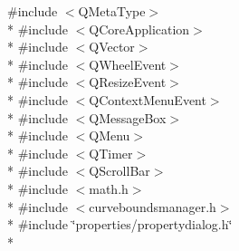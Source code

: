 {\ttfamily \#include $<$Q\+Meta\+Type$>$}\\*
{\ttfamily \#include $<$Q\+Core\+Application$>$}\\*
{\ttfamily \#include $<$Q\+Vector$>$}\\*
{\ttfamily \#include $<$Q\+Wheel\+Event$>$}\\*
{\ttfamily \#include $<$Q\+Resize\+Event$>$}\\*
{\ttfamily \#include $<$Q\+Context\+Menu\+Event$>$}\\*
{\ttfamily \#include $<$Q\+Message\+Box$>$}\\*
{\ttfamily \#include $<$Q\+Menu$>$}\\*
{\ttfamily \#include $<$Q\+Timer$>$}\\*
{\ttfamily \#include $<$Q\+Scroll\+Bar$>$}\\*
{\ttfamily \#include $<$math.\+h$>$}\\*
{\ttfamily \#include $<$curveboundsmanager.\+h$>$}\\*
{\ttfamily \#include \char`\"{}properties/propertydialog.\+h\char`\"{}}\\*
